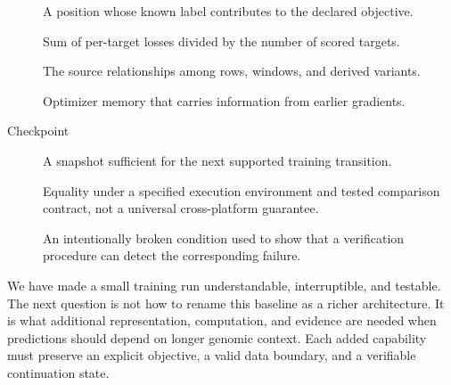 \begin{description}
\item[] A position whose known label contributes to the declared objective.
\item[] Sum of per-target losses divided by the number of scored targets.
\item[] The source relationships among rows, windows, and derived variants.
\item[] Optimizer memory that carries information from earlier gradients.
\item[Checkpoint] A snapshot sufficient for the next supported training transition.
\item[] Equality under a specified execution environment and tested comparison contract, not a universal cross-platform guarantee.
\item[] An intentionally broken condition used to show that a verification procedure can detect the corresponding failure.
\end{description}

We have made a small training run understandable, interruptible, and testable. The next question is not how to rename this baseline as a richer architecture. It is what additional representation, computation, and evidence are needed when predictions should depend on longer genomic context. Each added capability must preserve an explicit objective, a valid data boundary, and a verifiable continuation state.
